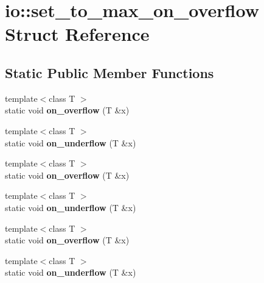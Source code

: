 \hypertarget{structio_1_1set__to__max__on__overflow}{}\section{io\+:\+:set\+\_\+to\+\_\+max\+\_\+on\+\_\+overflow Struct Reference}
\label{structio_1_1set__to__max__on__overflow}
\subsection*{Static Public Member Functions}
\begin{DoxyCompactItemize}
\item 
\mbox{\label{structio_1_1set__to__max__on__overflow_a770dee97a1ee55131163e6be8d4c0d9d}} 
{\footnotesize template$<$class T $>$ }\\static void {\bfseries on\+\_\+overflow} (T \&x)
\item 
\mbox{\label{structio_1_1set__to__max__on__overflow_a812d316e2b23247df19ca83bfda90a59}} 
{\footnotesize template$<$class T $>$ }\\static void {\bfseries on\+\_\+underflow} (T \&x)
\item 
\mbox{\label{structio_1_1set__to__max__on__overflow_a770dee97a1ee55131163e6be8d4c0d9d}} 
{\footnotesize template$<$class T $>$ }\\static void {\bfseries on\+\_\+overflow} (T \&x)
\item 
\mbox{\label{structio_1_1set__to__max__on__overflow_a812d316e2b23247df19ca83bfda90a59}} 
{\footnotesize template$<$class T $>$ }\\static void {\bfseries on\+\_\+underflow} (T \&x)
\item 
\mbox{\label{structio_1_1set__to__max__on__overflow_a770dee97a1ee55131163e6be8d4c0d9d}} 
{\footnotesize template$<$class T $>$ }\\static void {\bfseries on\+\_\+overflow} (T \&x)
\item 
\mbox{\label{structio_1_1set__to__max__on__overflow_a812d316e2b23247df19ca83bfda90a59}} 
{\footnotesize template$<$class T $>$ }\\static void {\bfseries on\+\_\+underflow} (T \&x)
\end{DoxyCompactItemize}


